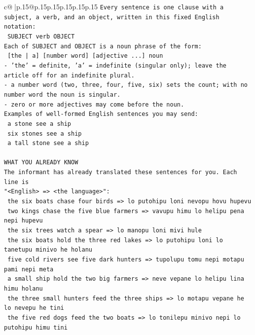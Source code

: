 \documentclass{article}
\begin{document}
{\begin{supertabular}{c@{$\;$}|p{.15\linewidth}@{}p{.15\linewidth}p{.15\linewidth}p{.15\linewidth}p{.15\linewidth}p{.15\linewidth}}
{{{\texttt{Every sentence is one clause with a subject, a verb, and an object, written in this fixed English notation:} \\
\texttt{    SUBJECT  verb  OBJECT} \\
\texttt{Each of SUBJECT and OBJECT is a noun phrase of the form:} \\
\texttt{    {[}the | a{]}  {[}number word{]}  {[}adjective ...{]}  noun} \\
\texttt{{-} 'the' = definite, 'a' = indefinite (singular only); leave the article off for an indefinite plural.} \\
\texttt{{-} a number word (two, three, four, five, six) sets the count; with no number word the noun is singular.} \\
\texttt{{-} zero or more adjectives may come before the noun.} \\
\texttt{Examples of well{-}formed English sentences you may send:} \\
\texttt{    a stone see a ship} \\
\texttt{    six stones see a ship} \\
\texttt{    a tall stone see a ship} \\
\\ 
\texttt{WHAT YOU ALREADY KNOW} \\
\texttt{The informant has already translated these sentences for you. Each line is} \\
\texttt{"<English>  =>  <the language>":} \\
\texttt{    the six boats chase four birds  =>  lo putohipu loni nevopu hovu hupevu} \\
\texttt{    two kings chase the five blue farmers  =>  vavupu himu lo helipu pena nepi hupevu} \\
\texttt{    the six trees watch a spear  =>  lo manopu loni mivi hule} \\
\texttt{    the six boats hold the three red lakes  =>  lo putohipu loni lo tanetupu minivo he holanu} \\
\texttt{    five cold rivers see five dark hunters  =>  tupolupu tomu nepi motapu pami nepi meta} \\
\texttt{    a small ship hold the two big farmers  =>  neve vepane lo helipu lina himu holanu} \\
\texttt{    the three small hunters feed the three ships  =>  lo motapu vepane he lo nevepu he tini} \\
\texttt{    the five red dogs feed the two boats  =>  lo tonilepu minivo nepi lo putohipu himu tini} \\
}}}
\end{supertabular}}
\end{document}
